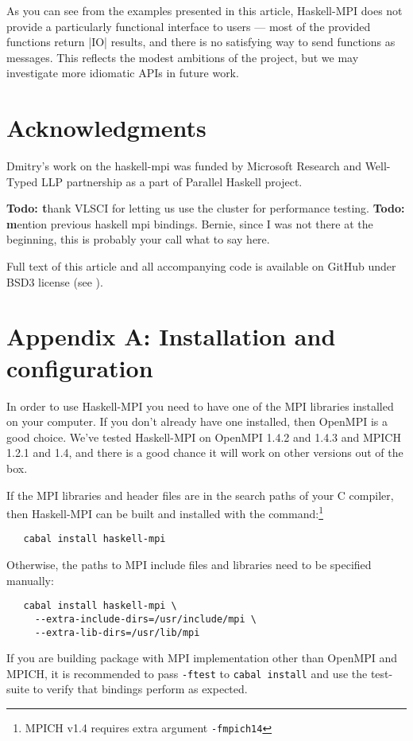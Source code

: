 \documentclass{tmr}
\newcommand{\Todo}[1]{{\textbf{Todo: #1}}}
\begin{document}
As you can see from the examples presented in this article, Haskell-MPI
does not provide a particularly functional interface to users --- most of the provided functions return
|IO| results, and there is no satisfying way to send functions as messages. This reflects the
modest ambitions of the project, but we may investigate more idiomatic APIs in future work.

\section{Acknowledgments}

Dmitry's work on the haskell-mpi was funded by Microsoft Research and Well-Typed LLP partnership as a part of Parallel Haskell project.

\Todo thank VLSCI for letting us use the cluster for performance testing.
\Todo mention previous haskell mpi bindings.
Bernie, since I was not there at the beginning, this is probably your call what to say here.

Full text of this article and all accompanying code is available on GitHub under BSD3 license (see \cite{article}).

\section{Appendix A: Installation and configuration}
\label{appendix-A}
In order to use Haskell-MPI you need to have one of the
MPI libraries installed on your computer. If you don't already have one installed, then 
OpenMPI is a good choice. We've tested Haskell-MPI on
OpenMPI 1.4.2 and 1.4.3 and MPICH 1.2.1 and 1.4, and there is a good chance it
will work on other versions out of the box.

If the MPI libraries and header files are in the search paths of your C
compiler, then Haskell-MPI can be built and installed with the
command:\footnote{MPICH v1.4 requires extra argument \verb|-fmpich14|}
\begin{Verbatim}
   cabal install haskell-mpi
\end{Verbatim}
Otherwise, the paths to MPI include
files and libraries need to be specified manually:
\begin{Verbatim}
   cabal install haskell-mpi \
     --extra-include-dirs=/usr/include/mpi \
     --extra-lib-dirs=/usr/lib/mpi
\end{Verbatim}

If you are building package with MPI implementation other than
OpenMPI and MPICH, it is recommended to pass \verb|-ftest| to
\verb|cabal install| and use the test-suite to verify that bindings
perform as expected.
\end{document}
